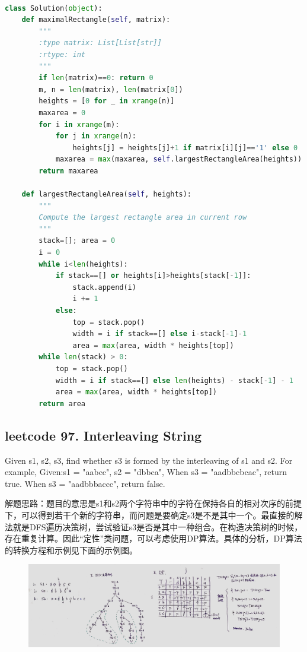 \documentclass[a4paper,10pt]{article}
\begin{document}
\begin{lstlisting}[language=Python, caption=Problem85. Maximal Rectangle]

class Solution(object):
    def maximalRectangle(self, matrix):
        """
        :type matrix: List[List[str]]
        :rtype: int
        """
        if len(matrix)==0: return 0
        m, n = len(matrix), len(matrix[0])
        heights = [0 for _ in xrange(n)]
        maxarea = 0
        for i in xrange(m):
            for j in xrange(n):
                heights[j] = heights[j]+1 if matrix[i][j]=='1' else 0
            maxarea = max(maxarea, self.largestRectangleArea(heights))
        return maxarea

    def largestRectangleArea(self, heights):
        """
        Compute the largest rectangle area in current row
        """
        stack=[]; area = 0
        i = 0
        while i<len(heights):
            if stack==[] or heights[i]>heights[stack[-1]]:
                stack.append(i)
                i += 1
            else:
                top = stack.pop()
                width = i if stack==[] else i-stack[-1]-1
                area = max(area, width * heights[top])
        while len(stack) > 0:
            top = stack.pop()
            width = i if stack==[] else len(heights) - stack[-1] - 1
            area = max(area, width * heights[top])
        return area
\end{lstlisting}


\subsection{leetcode 97. Interleaving String}
Given s1, s2, s3, find whether s3 is formed by the interleaving of s1 and s2. For example, Given:s1 = "aabcc", s2 = "dbbca", When s3 = "aadbbcbcac", return true. When s3 = "aadbbbaccc", return false. \\

\begin{CJK*}{UTF8}{gbsn}
\noindent 解题思路：题目的意思是s1和s2两个字符串中的字符在保持各自的相对次序的前提下，可以得到若干个新的字符串，而问题是要确定s3是不是其中一个。最直接的解法就是DFS遍历决策树，尝试验证s3是否是其中一种组合。在构造决策树的时候，存在重复计算。因此“定性”类问题，可以考虑使用DP算法。具体的分析，DP算法的转换方程和示例见下面的示例图。
\end{CJK*}

\begin{figure}[h]
\includegraphics[width=\textwidth]{leetcode97.jpg}
\centering \\
\end{figure}
\end{document}
